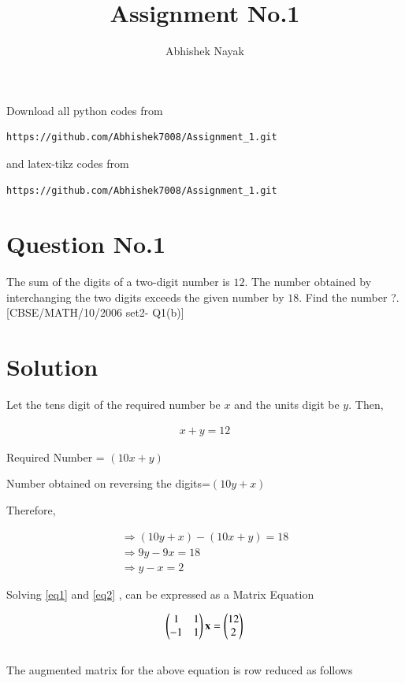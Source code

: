 \documentclass[journal,12pt,twocolumn]{IEEEtran}
\begin{document}
\def\rightbox#1{\makebox[0in][r]{#1}}
\def\centbox#1{\makebox[0in]{#1}}
\def\topbox#1{\raisebox{-\baselineskip}[0in][0in]{#1}}
\def\midbox#1{\raisebox{-0.5\baselineskip}[0in][0in]{#1}}
\vspace{3cm}
\title{Assignment No.1}
\author{Abhishek Nayak}
\maketitle
\newpage
\bigskip
\renewcommand{\thefigure}{\theenumi}
\renewcommand{\thetable}{\theenumi}
Download all python codes from
\begin{lstlisting}
https://github.com/Abhishek7008/Assignment_1.git
\end{lstlisting}
%
and latex-tikz codes from
%
\begin{lstlisting}
https://github.com/Abhishek7008/Assignment_1.git
\end{lstlisting}
%
\section{Question No.1}

The sum of the digits of a two-digit number is $12$. The number obtained by interchanging the two digits exceeds the given number by $18$. Find the number ?.
[CBSE/MATH/10/2006 set2- Q1(b)]
\section{Solution}

Let the tens digit of the required number be $x$ and the units digit be $y$. Then,

\begin{align}
     x+y=12\label{eq1}
\end{align}
   
Required Number = $(10x+y)$

Number obtained on reversing the digits=$(10y+x)$

Therefore,

\begin{align}
  \Rightarrow (10y+x)-(10x+y)= 18
  \\
\Rightarrow  9y-9x=18
\\ 
\Rightarrow y-x=2\label{eq2} 
\end{align}

 Solving  \ref{eq1} and \ref{eq2} , can be expressed as a Matrix Equation

 \begin{align}
          \begin{pmatrix}
1 & 1 \\
-1 & 1\end{pmatrix}
\mathbf{x} = 
\begin{pmatrix}
12 \\
2\end{pmatrix}
 \end{align}
 \\
The augmented matrix for the above equation
is row reduced as follows
\end{document}
